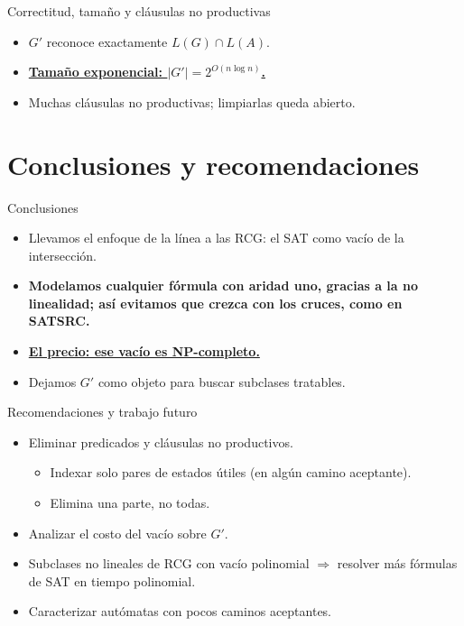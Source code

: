 \documentclass{beamer}
\newcommand{\destacar}[1]{\textbf{\underline{\textcolor{red!80!black}{#1}}}}
\newcommand{\azul}[1]{\textbf{\textcolor{blue!70!black}{#1}}}
\begin{document}
\begin{frame}{Correctitud, tamaño y cláusulas no productivas}
  \begin{itemize}
    \item<1-> $G'$ reconoce exactamente $L(G) \cap L(A)$.
    \item<2-> \destacar{Tamaño exponencial: $|G'| = 2^{O(n\log n)}$.}
    \item<3-> Muchas cláusulas no productivas; limpiarlas queda abierto.
  \end{itemize}
\end{frame}

\section{Conclusiones y recomendaciones}

\begin{frame}{Conclusiones}
  \begin{itemize}
    \item<1-> Llevamos el enfoque de la línea a las RCG: el SAT como vacío de la intersección.
    \item<2-> \azul{Modelamos cualquier fórmula con aridad uno, gracias a la no linealidad; así evitamos que crezca con los cruces, como en SATSRC.}
    \item<3-> \destacar{El precio: ese vacío es NP-completo.}
    \item<4-> Dejamos $G'$ como objeto para buscar subclases tratables.
  \end{itemize}
\end{frame}

\begin{frame}{Recomendaciones y trabajo futuro}
  \begin{itemize}
    \item<1-> Eliminar predicados y cláusulas no productivos.
      \begin{itemize}
        \item<2-> Indexar solo pares de estados útiles (en algún camino aceptante).
        \item<3-> Elimina una parte, no todas.
      \end{itemize}
    \item<4-> Analizar el costo del vacío sobre $G'$.
    \item<5-> Subclases no lineales de RCG con vacío polinomial $\Rightarrow$ resolver más fórmulas de SAT en tiempo polinomial.
    \item<6-> Caracterizar autómatas con pocos caminos aceptantes.
  \end{itemize}
\end{frame}
\end{document}
